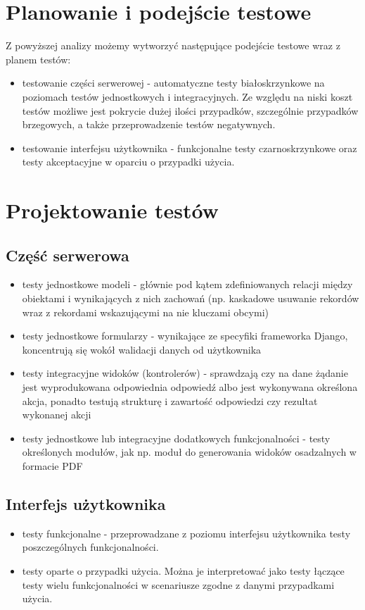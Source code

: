 \documentclass[declaration,shortabstract]{iithesis}
\begin{document}
\section{Planowanie i podejście testowe}
Z powyższej analizy możemy wytworzyć następujące podejście testowe wraz z planem testów:
\begin{itemize}
	\item testowanie części serwerowej - automatyczne testy białoskrzynkowe na poziomach testów jednostkowych i integracyjnych. Ze względu na niski koszt testów możliwe jest pokrycie dużej ilości przypadków, szczególnie przypadków brzegowych, a także przeprowadzenie testów negatywnych.
	\item testowanie interfejsu użytkownika - funkcjonalne testy czarnoskrzynkowe oraz testy akceptacyjne w oparciu o przypadki użycia. 
\end{itemize}

\section{Projektowanie testów}
\subsection{Część serwerowa}
\begin{itemize}
	\item testy jednostkowe modeli - głównie pod kątem zdefiniowanych relacji między obiektami i wynikających z nich zachowań (np. kaskadowe usuwanie rekordów wraz z rekordami wskazującymi na nie kluczami obcymi)
	\item testy jednostkowe formularzy - wynikające ze specyfiki frameworka Django, koncentrują się wokół walidacji danych od użytkownika
	\item testy integracyjne widoków (kontrolerów) - sprawdzają czy na dane żądanie jest wyprodukowana odpowiednia odpowiedź albo jest wykonywana określona akcja, ponadto testują strukturę i zawartość odpowiedzi czy rezultat wykonanej akcji
	\item testy jednostkowe lub integracyjne dodatkowych funkcjonalności - testy określonych modułów, jak np. moduł do generowania widoków osadzalnych w formacie PDF
\end{itemize}

\subsection{Interfejs użytkownika}
\begin{itemize}
	\item testy funkcjonalne - przeprowadzane z poziomu interfejsu użytkownika testy poszczególnych funkcjonalności.
	\item testy oparte o przypadki użycia. Można je interpretować jako testy łączące testy wielu funkcjonalności w scenariusze zgodne z danymi przypadkami użycia.
\end{itemize}
\end{document}

